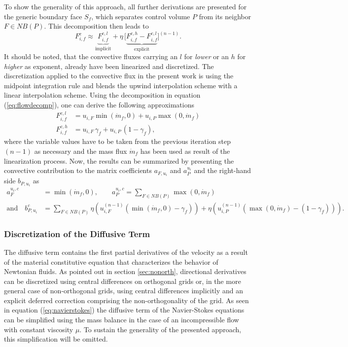 To show the generality of this approach, all further derivations are presented for the generic boundary face \(S_f\), which separates control volume \(P\) from its neighbor \(F \in NB(P)\). This decomposition then leads to
\begin{equation}
  \label{eq:flowdecomp}
  F_{i,f}^c \approx  \underbrace{F_{i,f}^{c,l}}_{\text{implicit}} + \eta \, \bigl[\underbrace{ F_{i,f}^{c,h} - F_{i,f}^{c,l} }_{\text{explicit}}\bigr]^{(n-1)}.
\end{equation}
It should be noted, that the convective fluxes carrying an \(l\) for \emph{lower} or an \(h\) for \emph{higher} as exponent, already have been linearized and discretized. The discretization applied to the convective flux in the present work is using the midpoint integration rule and blends the upwind interpolation scheme with a linear interpolation scheme. Using the decomposition in equation (\ref{eq:flowdecomp}), one can derive the following approximations
\begin{align*}
  F_{i,f}^{c,l} &= u_{i,F} \min(\dot{m}_f ,0) + u_{i,P} \max(0,\dot{m}_f) \\
  F_{i,f}^{c,h} &= u_{i,F} \, \gamma_f + u_{i,P} \, (1 - \gamma_f),
\end{align*}
where the variable values have to be taken from the previous iteration step \((n-1)\) as necessary and the mass flux \(\dot{m}_f\) has been used as result of the linearization process. Now, the results can be summarized by presenting the convective contribution to the matrix coefficients \(a_{F,u_i}\) and \(a_P^{u_i}\) and the right-hand side \(b_{P,u_i}\) as
\begin{align*}
  a_F^{u_i,c} &= \min(\dot{m}_f ,0), \quad \quad a_P^{u_i,c} = \sum_{F \in NB(P)} \max(0,\dot{m}_f) \\[1em]
  \text{and} \quad b_{P,u_i}^c &= \sum_{F \in NB(P)} \eta  \left(u_{i,F}^{(n-1)} \left( \min(\dot{m}_f,0) - \gamma_f \right)\right)
                   + \eta \left( u_{i,P}^{(n-1)} \left( \max(0,\dot{m}_f) - \left(1 - \gamma_f\right) \right)\right).
\end{align*}

\subsubsection{Discretization of the Diffusive Term}

The diffusive term contains the first partial derivatives of the velocity as a result of the material constitutive equation that characterizes the behavior of Newtonian fluids. As pointed out in section \ref{sec:nonorth}, directional derivatives can be discretized using central differences on orthogonal grids or, in the more general case of non-orthogonal grids, using central differences implicitly and an explicit deferred correction comprising the non-orthogonality of the grid. As seen in equation (\ref{eq:navierstokes}) the diffusive term of the Navier-Stokes equations can be simplified using the mass balance in the case of an incompressible flow with constant viscosity \(\mu\). To sustain the generality of the presented approach, this simplification will be omitted.

